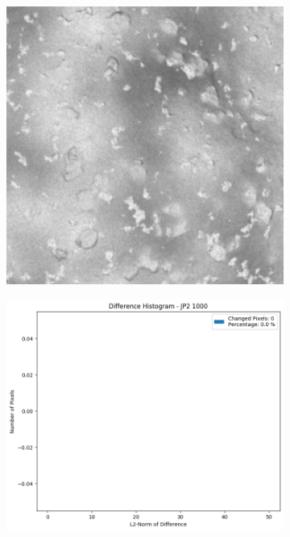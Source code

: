 \begin{figure}[htb]
    \centering
    \begin{subfigure}[b]{0.48\textwidth}
        \centering
        \includegraphics[width=\textwidth]{doc/thesis/0_figures/compare_quality/set1/jp2_1000_center.png}
        \caption{}
        \label{fig:img_quality_comp_jp2_1000_center_orig}
    \end{subfigure}
    \begin{subfigure}[b]{0.48\textwidth}
        \centering
        \includegraphics[width=\textwidth]{doc/thesis/0_figures/compare_quality/set1/jp2_1000_center_diff_histogram.png}

\end{subfigure}
\end{figure}
